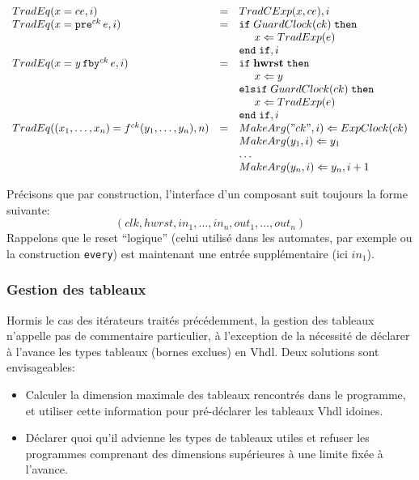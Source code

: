 \documentclass[a4paper]{article}
\newcommand{\vhdl}{{\sc Vhdl}}
\newcommand{\mybox}[1]{\mbox{\tt{#1}}}
\newcommand{\ind}[0]{\hspace{0.5cm}}
\newcommand{\Fby}[2]{#1 \, \mybox{fby}^{ck} \, #2}
\newcommand{\Pre}[1]{\mybox{pre}^{ck} \, #1}
\newcommand{\App}[2]{#1^{ck}(#2)}
\newcommand{\Assign}[2]{#1 \Leftarrow #2}
\begin{document}
\newcommand{\TradEq}[2]{TradEq(#1,#2)}
\newcommand{\MA}[2]{MakeArg(#1,#2)}

\[
\begin{array}{lcl}
  \TradEq{x = ce}{i} & = & \TradCE{x}{ce}, i \\

  \TradEq{x = \Pre{e}}{i} & = & \mathtt{if} \; \GEC{ck} \; \mathtt{then} \\
  & & \ind \Assign{x}{\TradE{e}} \\
  & & \mathtt{end} \; \mathtt{if}, i \\

  \TradEq{x = \Fby{y}{e}}{i} & = & \mathtt{if} \; \mathbf{hwrst}
  \; \mathtt{then} \\
  & & \ind \Assign{x}{y} \\
  & & \mathtt{elsif} \; \GEC{ck} \; \mathtt{then} \\
  & & \ind \Assign{x}{\TradE{e}} \\
  & & \mathtt{end} \; \mathtt{if}, i \\


  \TradEq{(x_1,\dots,x_n) = \App{f}{y_1,\dots,y_n}}{n} & = &
  \Assign{\MA{"ck"}{i}}{\EC{ck}} \\
  & & \Assign{\MA{y_1}{i}}{y_1} \\
  & & \dots \\
  & & \Assign{\MA{y_n}{i}}{y_n}, i + 1 \\
\end{array}
\]

Précisons que par construction, l'interface d'un composant suit toujours la
forme suivante:
\[(clk, hwrst, in_1, \dots,in_n, out_1,\dots,out_n)
\]
Rappelons que le reset ``logique'' (celui utilisé dans les automates, par exemple
ou la construction \verb-every-) est maintenant une entrée supplémentaire (ici $in_1$).

\subsubsection{Gestion des tableaux}

Hormis le cas des itérateurs traités précédemment, la gestion des
tableaux n'appelle pas de commentaire particulier, à l'exception de la
nécessité de déclarer à l'avance les types tableaux (bornes exclues) en
\vhdl{}. Deux solutions sont envisageables:

\begin{itemize}
\item Calculer la dimension maximale des tableaux rencontrés dans le programme,
  et utiliser cette information pour pré-déclarer les tableaux \vhdl{} idoines.
\item Déclarer quoi qu'il advienne les types de tableaux utiles et refuser les
  programmes comprenant des dimensions supérieures à une limite fixée à l'avance.
\end{itemize}
\end{document}
